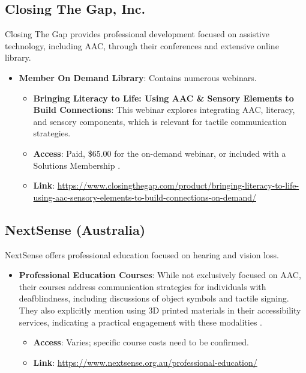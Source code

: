 \subsection{Closing The Gap, Inc.}
Closing The Gap provides professional development focused on assistive technology, including AAC, through their conferences and extensive online library.
\begin{itemize}
    \item \textbf{Member On Demand Library}: Contains numerous webinars.
    \begin{itemize}
        \item \textbf{Bringing Literacy to Life: Using AAC \& Sensory Elements to Build Connections}: This webinar explores integrating AAC, literacy, and sensory components, which is relevant for tactile communication strategies.
        \item \textbf{Access}: Paid, \$65.00 for the on-demand webinar, or included with a Solutions Membership  \cite{CTG_Literacy}.
        \item \textbf{Link}: \url{https://www.closingthegap.com/product/bringing-literacy-to-life-using-aac-sensory-elements-to-build-connections-on-demand/}
    \end{itemize}
\end{itemize}

\subsection{NextSense (Australia)}
NextSense offers professional education focused on hearing and vision loss.
\begin{itemize}
    \item \textbf{Professional Education Courses}: While not exclusively focused on AAC, their courses address communication strategies for individuals with deafblindness, including discussions of object symbols and tactile signing. They also explicitly mention using 3D printed materials in their accessibility services, indicating a practical engagement with these modalities  \cite{NextSense_Services}.
    \begin{itemize}
        \item \textbf{Access}: Varies; specific course costs need to be confirmed.
        \item \textbf{Link}: \url{https://www.nextsense.org.au/professional-education/}
    \end{itemize}
\end{itemize}

